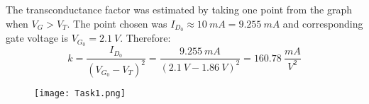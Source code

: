 The transconductance factor was estimated by taking one point from the graph when $V_G > V_T$. The point chosen was $I_{D_0} \approx 10 \ mA = 9.255 \ mA $ and corresponding gate voltage is $V_{G_0} = 2.1 \ V$. Therefore: $$ k = \dfrac{I_{D_0}}{(V_{G_0}-V_T)^2} = \dfrac{9.255 \ mA}{(2.1 \ V - 1.86 \ V)^2} = 160.78 \ \dfrac{mA}{V^2} $$

\begin{figure}[h!]
        \centering
        \texttt{[image: Task1.png]}
\end{figure}

